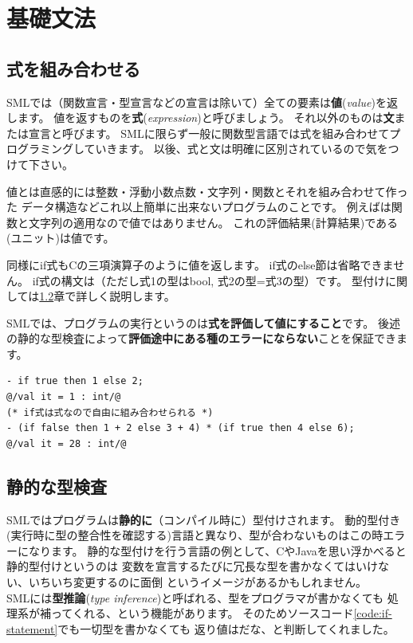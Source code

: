 \documentclass[11pt,a4paper]{jarticle}
\begin{document}
\section{基礎文法}

\subsection{式を組み合わせる}

SMLでは（関数宣言・型宣言などの宣言は除いて）全ての要素は{\bfseries 値}({\itshape value})を返します。
値を返すものを{\bfseries 式}({\itshape expression})と呼びましょう。
それ以外のものは{\bfseries 文}または宣言と呼びます。
SMLに限らず一般に関数型言語では式を組み合わせてプログラミングしていきます。
以後、式と文は明確に区別されているので気をつけて下さい。

値とは直感的には整数・浮動小数点数・文字列・関数とそれを組み合わせて作った
データ構造などこれ以上簡単に出来ないプログラムのことです。
例えばは関数と文字列の適用なので値ではありません。
これの評価結果(計算結果)である\prog{()}(ユニット)は値です。

同様にif式もCの三項演算子のように値を返します。
if式のelse節は省略できません。
if式の構文は（ただし式1の型はbool, 式2の型=式3の型）です。
型付けに関しては\ref{sec:static-typing}章で詳しく説明します。

SMLでは、プログラムの実行というのは{\bfseries 式を評価して値にすること}です。
後述の静的な型検査によって{\bfseries 評価途中にある種のエラーにならない}ことを保証できます。

\begin{lstlisting}[caption=if文は式,label=code:if-statement]
- if true then 1 else 2;
@/val it = 1 : int/@
(* if式は式なので自由に組み合わせられる *)
- (if false then 1 + 2 else 3 + 4) * (if true then 4 else 6);
@/val it = 28 : int/@
\end{lstlisting}

\subsection{静的な型検査}
\label{sec:static-typing}

SMLではプログラムは{\bfseries 静的に}（コンパイル時に）型付けされます。
動的型付き(実行時に型の整合性を確認する)言語と異なり、型が合わないものはこの時エラーになります。
静的な型付けを行う言語の例として、CやJavaを思い浮かべると静的型付けというのは
変数を宣言するたびに冗長な型を書かなくてはいけない、いちいち変更するのに面倒
というイメージがあるかもしれません。\\
SMLには{\bfseries 型推論}({\itshape type inference})と呼ばれる、型をプログラマが書かなくても
処理系が補ってくれる、という機能があります。
そのためソースコード\ref{code:if-statement}でも一切型を書かなくても
返り値はだな、と判断してくれました。
\end{document}
